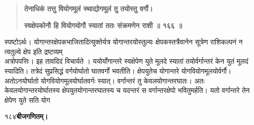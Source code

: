 \documentclass[11pt, openany]{book}
\begin{document}
\begin{sloppypar}
\begin{quote}
\hspace{0.5in}\textbf{तेनाधिकं तत्तु वियोगमूलं स्थाद्योगमूलं तु तयोस्तु वर्गौ।}

\hspace{0.5in}\textbf{स्वक्षेपकोनौ हि वियोगयोगौ स्यातां ततः संक्रमणेन राशी ॥ १६६ ॥}
\end{quote}

\hangindent=0.2in \hspace{0.2in}स्पष्टोऽर्थः। योगान्तरक्षेपकभाजितादित्युक्तेर्यत्र योगान्तरयोस्तुल्यः क्षेपकस्तत्रैवानेन सूत्रेण राशिकल्पनं न त्वतुल्ये क्षेप इति द्रष्टव्यम्\\

\hangindent=0.2in \hspace{0.2in}अत्रोपपत्तिः। इह तावदिदं विचार्यते । ययोर्योगान्तरे स्वक्षेपेण युते मूलदे स्यातां तयोर्वर्गान्तरं केन युतं मूलदं स्यादिति। तत्रेदं सुप्रसिद्धं वर्गयोर्घातो घातवर्गो भवतीति। क्षेपयुतेच योगान्तरे योगवियोगमूलयोर्वर्गौ। अतोऽनयोर्घातो योगवियोगमूलयोर्घातवर्गः स्यात्। वर्गान्तरं तु केवलयोगान्तरघातः। अतः केवलयोगान्तरयोर्घातस्य क्षेपयुतयोगान्तरघातस्य च यदन्तरं स वर्गान्तरक्षेपो भवितुमर्हति। यतो वर्गान्तरे तेन क्षेपेण युते सति योग
\end{sloppypar}
\thispagestyle{empty}
\newpage

\onehalfspacing
 १८४\hspace{2in}\textbf{बीजगणितम्।} 

\vspace{5mm}
\end{document}
